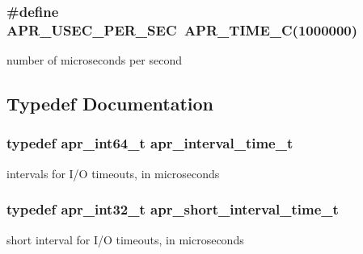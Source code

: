 \subsubsection[{\texorpdfstring{A\+P\+R\+\_\+\+U\+S\+E\+C\+\_\+\+P\+E\+R\+\_\+\+S\+EC}{APR_USEC_PER_SEC}}]{\setlength{\rightskip}{0pt plus 5cm}\#define A\+P\+R\+\_\+\+U\+S\+E\+C\+\_\+\+P\+E\+R\+\_\+\+S\+EC~{\bf A\+P\+R\+\_\+\+T\+I\+M\+E\+\_\+C}(1000000)}\hypertarget{group__apr__time_gab4dd3f3015d25a50f3be3e0e91043abf}{}\label{group__apr__time_gab4dd3f3015d25a50f3be3e0e91043abf}
number of microseconds per second 

\subsection{Typedef Documentation}
\subsubsection[{\texorpdfstring{apr\+\_\+interval\+\_\+time\+\_\+t}{apr_interval_time_t}}]{\setlength{\rightskip}{0pt plus 5cm}typedef {\bf apr\+\_\+int64\+\_\+t} {\bf apr\+\_\+interval\+\_\+time\+\_\+t}}\hypertarget{group__apr__time_gaae2129185a395cc393f76fabf4f43e47}{}\label{group__apr__time_gaae2129185a395cc393f76fabf4f43e47}
intervals for I/O timeouts, in microseconds 
\subsubsection[{\texorpdfstring{apr\+\_\+short\+\_\+interval\+\_\+time\+\_\+t}{apr_short_interval_time_t}}]{\setlength{\rightskip}{0pt plus 5cm}typedef {\bf apr\+\_\+int32\+\_\+t} {\bf apr\+\_\+short\+\_\+interval\+\_\+time\+\_\+t}}\hypertarget{group__apr__time_ga3e4663cc0d8b730902ff697c8d3f64be}{}\label{group__apr__time_ga3e4663cc0d8b730902ff697c8d3f64be}
short interval for I/O timeouts, in microseconds 
